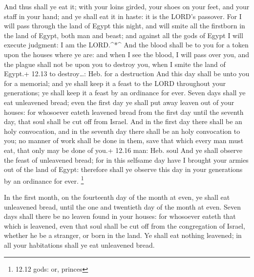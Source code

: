  And thus shall ye eat it; with your loins girded, your
shoes on your feet, and your staff in your hand; and ye shall eat it in
haste: it is the LORD's passover.  For I will pass through
the land of Egypt this night, and will smite all the firstborn in the
land of Egypt, both man and beast; and against all the gods of Egypt I
will execute judgment: I am the LORD.\^{}*\^{}  And the
blood shall be to you for a token upon the houses where ye are: and when
I see the blood, I will pass over you, and the plague shall not be upon
you to destroy you, when I smite the land of Egypt.+ 12.13 to
destroy\ldots: Heb. for a destruction  And this day shall
be unto you for a memorial; and ye shall keep it a feast to the LORD
throughout your generations; ye shall keep it a feast by an ordinance
for ever.  Seven days shall ye eat unleavened bread; even
the first day ye shall put away leaven out of your houses: for whosoever
eateth leavened bread from the first day until the seventh day, that
soul shall be cut off from Israel.  And in the first day
there shall be an holy convocation, and in the seventh day there shall
be an holy convocation to you; no manner of work shall be done in them,
save that which every man must eat, that only may be done of you.+ 12.16
man: Heb. soul  And ye shall observe the feast of
unleavened bread; for in this selfsame day have I brought your armies
out of the land of Egypt: therefore shall ye observe this day in your
generations by an ordinance for ever. \footnote{12.12 gods: or, princes}

 In the first month, on the fourteenth day of the month at
even, ye shall eat unleavened bread, until the one and twentieth day of
the month at even.  Seven days shall there be no leaven
found in your houses: for whosoever eateth that which is leavened, even
that soul shall be cut off from the congregation of Israel, whether he
be a stranger, or born in the land.  Ye shall eat nothing
leavened; in all your habitations shall ye eat unleavened bread.

